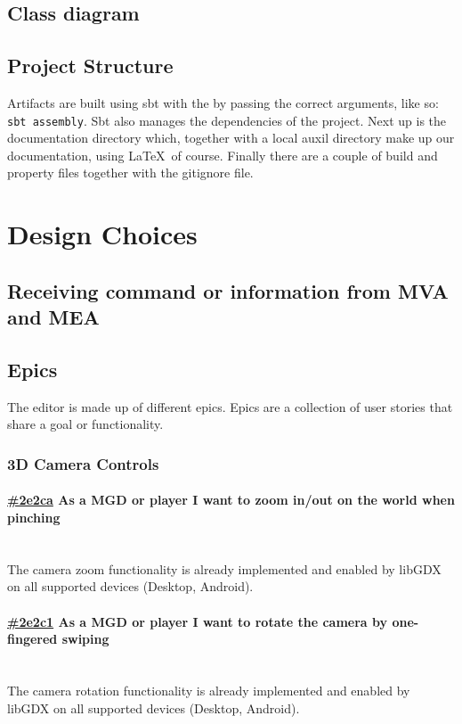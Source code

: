 \documentclass[10pt]{extarticle} %
\newcommand{\myparagraph}[1]{\paragraph{#1}\mbox{}\\} %
\begin{document}
    \subsection[class_diagram]{Class diagram}

    \subsection{Project Structure}
    Artifacts are built using sbt with the by passing the correct arguments, like so: \texttt{sbt assembly}.
    Sbt also manages the dependencies of the project.
    Next up is the documentation directory which, together with a local auxil directory make up our documentation, using \LaTeX\ of course.
    Finally there are a couple of build and property files together with the gitignore file.

    \newpage

    \section{Design Choices}
    \label{sec:designchoices}

    \subsection[Communication MVA-MEA]{Receiving command or information from MVA and MEA}
    \label{subsec:comchoice}


    \subsection{Epics}
    \label{subsec:epics}
    The editor is made up of different epics.
    Epics are a collection of user stories that share a goal or functionality.

    \newcommand{\clickup}[1]{https://app.clickup.com/757520/761304/t/#1}

    \subsubsection{3D Camera Controls}
    \myparagraph{\href{\clickup{2e2ca}}{\#2e2ca} As a MGD or player I want to zoom in/out on the world when pinching}
    The camera zoom functionality is already implemented and enabled by libGDX on all supported devices (Desktop, Android).
    \myparagraph{\href{\clickup{2e2c1}}{\#2e2c1} As a MGD or player I want to rotate the camera by one-fingered swiping}
    The camera rotation functionality is already implemented and enabled by libGDX on all supported devices (Desktop, Android).
\end{document}
